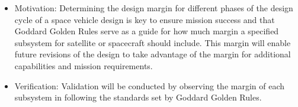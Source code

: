 \begin{enumerate}
\begin{enumerate}
\begin{enumerate}
                        \begin{itemize}
                            \item Motivation: Determining the design margin for different phases of the design cycle of a space vehicle design is key to ensure mission success and that Goddard Golden Rules serve as a guide for how much margin a specified subsystem for satellite or spacecraft should include. This margin will enable future revisions of the design to take advantage of the margin for additional capabilities and mission requirements. 
                            \item Verification: Validation will be conducted by observing the margin of each subsystem in following the standards set by Goddard Golden Rules.   \end{itemize}
                \end{enumerate}
        \end{enumerate}
\end{enumerate}
